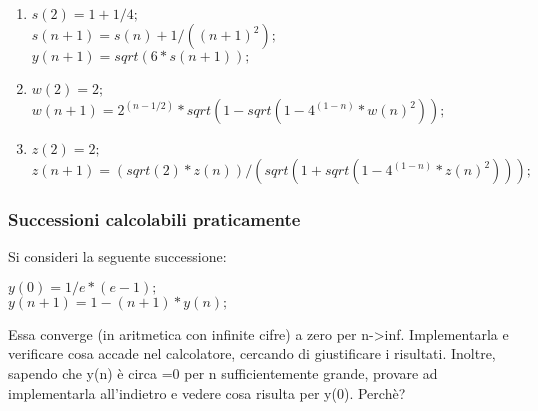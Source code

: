 \begin{enumerate}
	\item $s(2)=1+1/4;$ \\ $s(n+1)=s(n)+1/((n+1)^2);$ \\ $y(n+1)= sqrt(6*s(n+1));$
	\item $w(2)=2;$ \\ $w(n+1)=2^(n-1/2)*sqrt(1-sqrt(1-4^(1-n)*w(n)^2));$
	\item $z(2)=2;$ \\ $z(n+1)=(sqrt(2)*z(n))/(sqrt(1+sqrt(1-4^(1-n)*z(n)^2)));$
	\linebreak[4]
	\linebreak[4]
\end{enumerate}




\subsubsection{Successioni calcolabili praticamente}

Si consideri la seguente successione:

\begin{center}
	$y(0)=1/e*(e-1);$
	\\
	$y(n+1)=1-(n+1)*y(n);$
\end{center}

Essa converge (in aritmetica con infinite cifre) a zero per n->inf. Implementarla e verificare cosa accade nel calcolatore, cercando di giustificare i risultati. Inoltre, sapendo che y(n) è circa =0 per n sufficientemente grande, provare ad implementarla all'indietro e vedere cosa risulta per y(0). Perchè?

